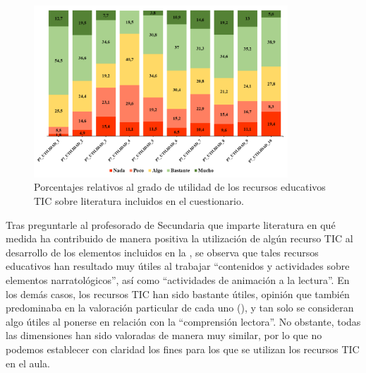 \documentclass[spanish]{textolivre}
\begin{document}
\begin{figure}[htbp]
 \centering
 \includegraphics[width=0.85\textwidth]{Fig01.png}
 \caption{Porcentajes relativos al grado de utilidad de los recursos educativos TIC sobre literatura incluidos en el cuestionario.}
 \label{fig01}
\end{figure}

Tras preguntarle al profesorado de Secundaria que imparte literatura en qué medida ha contribuido de manera positiva la utilización de algún recurso TIC al desarrollo de los elementos incluidos en la , se observa que tales recursos educativos han resultado muy útiles al trabajar “contenidos y actividades sobre elementos narratológicos”, así como “actividades de animación a la lectura”. En los demás casos, los recursos TIC han sido bastante útiles, opinión que también predominaba en la valoración particular de cada uno (), y tan solo se consideran algo útiles al ponerse en relación con la “comprensión lectora”. No obstante, todas las dimensiones han sido valoradas de manera muy similar, por lo que no podemos establecer con claridad los fines para los que se utilizan los recursos TIC en el aula.  
\end{document}
